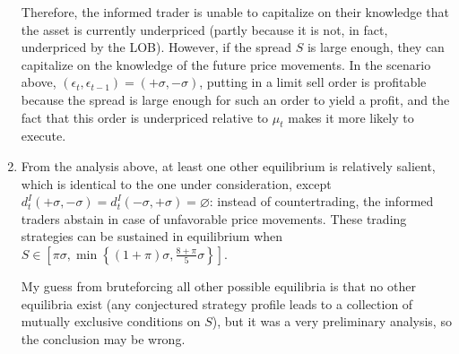 \documentclass[a4paper]{article}
\begin{document}
\begin{enumerate}
	Therefore, the informed trader is unable to capitalize on their knowledge that the asset is currently underpriced (partly because it is not, in fact, underpriced by the LOB). However, if the spread $S$ is large enough, they can capitalize on the knowledge of the future price movements. In the scenario above, $(\epsilon_t,\epsilon_{t-1})=(+\sigma,-\sigma)$, putting in a limit sell order is profitable because the spread is large enough for such an order to yield a profit, and the fact that this order is underpriced relative to $\mu_t$ makes it more likely to execute.
	
	\item From the analysis above, at least one other equilibrium is relatively salient, which is identical to the one under consideration, except $d^I_t(+\sigma, -\sigma) = d^I_t(-\sigma, +\sigma) = \varnothing$: instead of countertrading, the informed traders abstain in case of unfavorable price movements. These trading strategies can be sustained in equilibrium when $S \in \left[ \pi \sigma, \min \left\{ (1+\pi)\sigma, \frac{8+\pi}{5} \sigma \right\} \right]$.
	
	My guess from bruteforcing all other possible equilibria is that no other equilibria exist (any conjectured strategy profile leads to a collection of mutually exclusive conditions on $S$), but it was a very preliminary analysis, so the conclusion may be wrong.
\end{enumerate}
\fi
\end{document}
